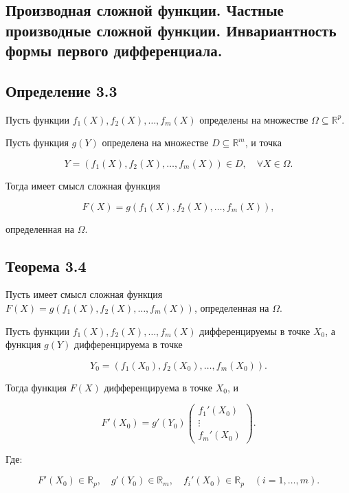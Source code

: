 {
\subsection{Производная сложной функции. Частные производные сложной функции. Инвариантность формы первого дифференциала.}

\subsection*{Определение 3.3}

Пусть функции \( f_1(X), f_2(X), \dots, f_m(X) \) определены на множестве \( \Omega \subseteq \mathbb{R}^p \).

Пусть функция \( g(Y) \) определена на множестве \( D \subseteq \mathbb{R}^m \), и точка 



\[
Y = (f_1(X), f_2(X), \dots, f_m(X)) \in D, \quad \forall X \in \Omega.
\]



Тогда имеет смысл сложная функция 



\[
F(X) = g(f_1(X), f_2(X), \dots, f_m(X)),
\]



определенная на \( \Omega \).

\subsection*{Теорема 3.4}

Пусть имеет смысл сложная функция \( F(X) = g(f_1(X), f_2(X), \dots, f_m(X)) \), определенная на \( \Omega \).

Пусть функции \( f_1(X), f_2(X), \dots, f_m(X) \) дифференцируемы в точке \( X_0 \), а функция \( g(Y) \) дифференцируема в точке



\[
Y_0 = (f_1(X_0), f_2(X_0), \dots, f_m(X_0)).
\]

Тогда функция \( F(X) \) дифференцируема в точке \( X_0 \), и

\[
F'(X_0) = g'(Y_0) \begin{pmatrix} f_1'(X_0) \\ \vdots \\ f_m'(X_0) \end{pmatrix}.
\]

Где:

\[
F'(X_0) \in \mathbb{R}_p, \quad g'(Y_0) \in \mathbb{R}_m, \quad f_i'(X_0) \in \mathbb{R}_p \quad (i=1, \dots, m).
\]

}
